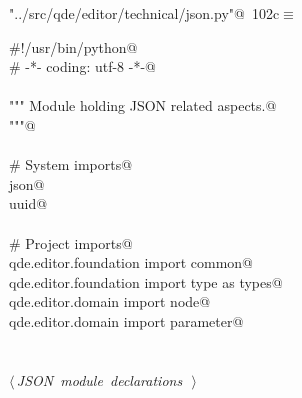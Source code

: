 \documentclass[
    a4paper,      %
    10pt,         %
    openright,    %
    notitlepage,  %
    parskip=half, %
]{scrreprt}       %
\theoremstyle{definition}                    %
\begin{document}
\begin{flushleft} \small
\begin{minipage}{\linewidth}\label{scrap166}\raggedright\small
{} \verb@"../src/qde/editor/technical/json.py"@\nobreak\ {\footnotesize {102c}}$\equiv$
\vspace{-1ex}
\begin{list}{}{} \item
\mbox{}\lstinline@#!/usr/bin/python@\\
\mbox{}\lstinline@# -*- coding: utf-8 -*-@\\
\mbox{}\lstinline@@\\
\mbox{}\lstinline@""" Module holding JSON related aspects.@\\
\mbox{}\lstinline@"""@\\
\mbox{}\lstinline@@\\
\mbox{}\lstinline@# System imports@\\
\mbox{}\lstinline@import json@\\
\mbox{}\lstinline@import uuid@\\
\mbox{}\lstinline@@\\
\mbox{}\lstinline@# Project imports@\\
\mbox{}\lstinline@from qde.editor.foundation import common@\\
\mbox{}\lstinline@from qde.editor.foundation import type as types@\\
\mbox{}\lstinline@from qde.editor.domain import node@\\
\mbox{}\lstinline@from qde.editor.domain import parameter@\\
\mbox{}\lstinline@@\\
\mbox{}\lstinline@@\\
\mbox{}\lstinline@@\hbox{$\langle\,${\itshape JSON module declarations}\nobreak\ {\footnotesize {}}$\,\rangle$}\lstinline@@\\
\mbox{}\lstinline@@{\NWsep}
\end{list}
\vspace{-1.5ex}
\footnotesize
\begin{list}{}{\setlength{\itemsep}{-\parsep}\setlength{\itemindent}{-\leftmargin}}

\item{}
\end{list}
\end{minipage}\vspace{4ex}
\end{flushleft}
\end{document}
